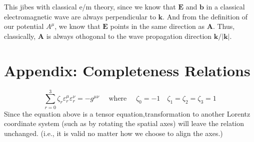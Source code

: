 This jibes with classical e/m theory, since we know that $\mathbf{E}$ and $\mathbf{b}$ in a classical electromagnetic wave are always perpendicular to $\mathbf{k}$. And from the definition of our potential $A^{\mu}$, we know that $\mathbf{E}$ points in the same direction as $\mathbf{A}$. Thus, classically, $\mathbf{A}$ is always othogonal to the wave propagation direction $\mathbf{k} /|\mathbf{k}|$.
\section{Appendix: Completeness Relations}
\begin{equation}
\sum_{r=0}^{3} \zeta_{r} \varepsilon_{r}^{\mu} \varepsilon_{r}^{\nu}=-g^{\mu \nu} \quad \text { where } \quad \zeta_{0}=-1 \quad \zeta_{1}=\zeta_{2}=\zeta_{3}=1
\end{equation}
Since the equation above is a tensor equation,transformation to another Lorentz coordinate system (such as by
rotating the spatial axes) will leave the relation unchanged. (i.e., it is valid no matter how we choose to align the axes.)